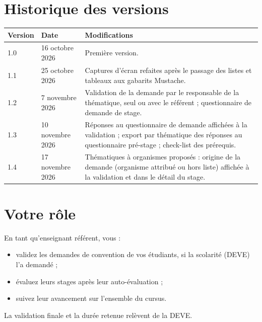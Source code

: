 \documentclass[11pt,a4paper]{article}
\begin{document}

\tableofcontents

\section*{Historique des versions}

\begin{center}
\begin{tabularx}{\linewidth}{@{}l l X@{}}
\toprule
\textbf{Version} & \textbf{Date} & \textbf{Modifications} \\
\midrule
1.0 & 16 octobre 2026 & Première version. \\
1.1 & 25 octobre 2026 & Captures d'écran refaites après le passage des listes et tableaux aux gabarits Mustache. \\
1.2 & 7 novembre 2026 & Validation de la demande par le responsable de la thématique, seul ou avec le référent ; questionnaire de demande de stage. \\
1.3 & 10 novembre 2026 & Réponses au questionnaire de demande affichées à la validation ; export par thématique des réponses au questionnaire pré-stage ; check-list des prérequis. \\
1.4 & 17 novembre 2026 & Thématiques à organismes proposés : origine de la demande (organisme attribué ou hors liste) affichée à la validation et dans le détail du stage. \\
\bottomrule
\end{tabularx}
\end{center}

\newpage

\section{Votre rôle}

En tant qu'enseignant référent, vous :
\begin{itemize}
  \item validez les demandes de convention de vos étudiants, si la scolarité
        (DEVE) l'a demandé ;
  \item évaluez leurs stages après leur auto-évaluation ;
  \item suivez leur avancement sur l'ensemble du cursus.
\end{itemize}
La validation finale et la durée retenue relèvent de la DEVE.
\end{document}
